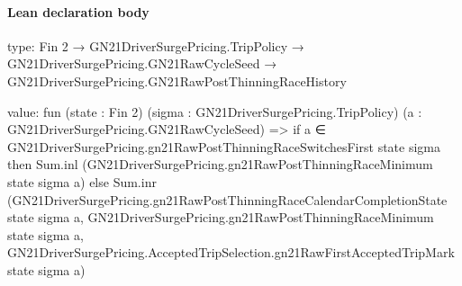 \documentclass[10pt]{article}
\begin{document}
\paragraph{Lean declaration body}
\begin{ReviewVerbatim}
type:
Fin 2 →
  GN21DriverSurgePricing.TripPolicy →
    GN21DriverSurgePricing.GN21RawCycleSeed → GN21DriverSurgePricing.GN21RawPostThinningRaceHistory

value:
fun (state : Fin 2) (sigma : GN21DriverSurgePricing.TripPolicy) (a : GN21DriverSurgePricing.GN21RawCycleSeed) =>
  if a ∈ GN21DriverSurgePricing.gn21RawPostThinningRaceSwitchesFirst state sigma then
    Sum.inl (GN21DriverSurgePricing.gn21RawPostThinningRaceMinimum state sigma a)
  else
    Sum.inr
      (GN21DriverSurgePricing.gn21RawPostThinningRaceCalendarCompletionState state sigma a,
        GN21DriverSurgePricing.gn21RawPostThinningRaceMinimum state sigma a,
        GN21DriverSurgePricing.AcceptedTripSelection.gn21RawFirstAcceptedTripMark state sigma a)
\end{ReviewVerbatim}
\end{document}
